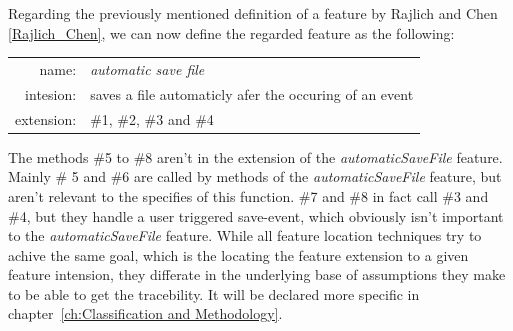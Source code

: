 Regarding the previously mentioned definition of a feature by Rajlich and Chen \ref{Rajlich_Chen}, we can now define the regarded feature as the following: \newline
\begin{tabular}{ r  l }
  name: & \emph{automatic save file}  \\
  intesion: & saves a file automaticly afer the occuring of an event\\
 extension: & \#1,  \#2, \#3 and \#4\\
\end{tabular}
The methods \#5 to \#8 aren't in the extension of the \emph{automaticSaveFile} feature.
Mainly \# 5 and \#6 are called by methods of the \emph{automaticSaveFile} feature, but aren't relevant to the specifies of this function.
\#7 and \#8 in fact call \#3 and \#4, but they handle a user triggered save-event, which obviously isn't important to the \emph{automaticSaveFile} feature.
\newline \newline
While all feature location techniques try to achive the same goal, which is the locating the feature extension to a given feature intension, they differate in the underlying base of assumptions they make to be able to get the tracebility. It will be declared more specific in chapter~\ref{ch:Classification and Methodology}. 
